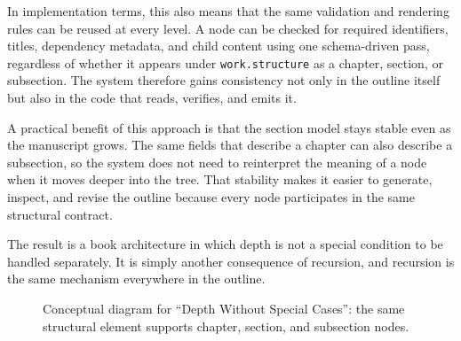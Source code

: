 In implementation terms, this also means that the same validation and rendering rules can be reused at every level. A node can be checked for required identifiers, titles, dependency metadata, and child content using one schema-driven pass, regardless of whether it appears under \texttt{work.structure} as a chapter, section, or subsection. The system therefore gains consistency not only in the outline itself but also in the code that reads, verifies, and emits it.

A practical benefit of this approach is that the section model stays stable even as the manuscript grows. The same fields that describe a chapter can also describe a subsection, so the system does not need to reinterpret the meaning of a node when it moves deeper into the tree. That stability makes it easier to generate, inspect, and revise the outline because every node participates in the same structural contract.

The result is a book architecture in which depth is not a special condition to be handled separately. It is simply another consequence of recursion, and recursion is the same mechanism everywhere in the outline.

\begin{figure}[htbp]
\centering

\caption{Conceptual diagram for ``Depth Without Special Cases'': the same structural element supports chapter, section, and subsection nodes.}
\end{figure}
